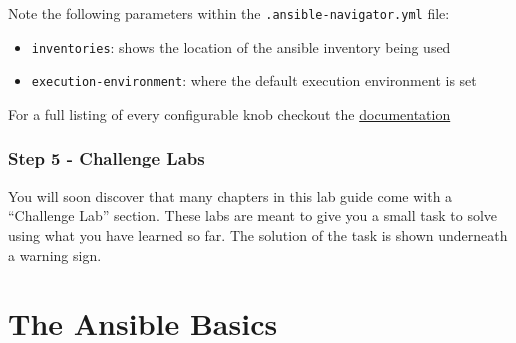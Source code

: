 \begin{Shaded}
\begin{Highlighting}[]
\ExtensionTok{$}
\ExtensionTok{{-}{-}{-}}
      \ExtensionTok{{-}}
    \ExtensionTok{{-}}
       
\end{Highlighting}
\end{Shaded}

Note the following parameters within the \texttt{.ansible-navigator.yml}
file:

\begin{itemize}
\tightlist
\item
  \texttt{inventories}: shows the location of the ansible inventory
  being used
\item
  \texttt{execution-environment}: where the default execution
  environment is set
\end{itemize}

For a full listing of every configurable knob checkout the
\href{https://ansible.readthedocs.io/projects/navigator/settings/}{documentation}

\hypertarget{step-5---challenge-labs}{%
\subsubsection{Step 5 - Challenge Labs}\label{step-5---challenge-labs}}

You will soon discover that many chapters in this lab guide come with a
``Challenge Lab'' section. These labs are meant to give you a small task
to solve using what you have learned so far. The solution of the task is
shown underneath a warning sign.

\hypertarget{the-ansible-basics}{%
\section{\texorpdfstring{The Ansible Basics
}{The Ansible Basics }}\label{the-ansible-basics}}

